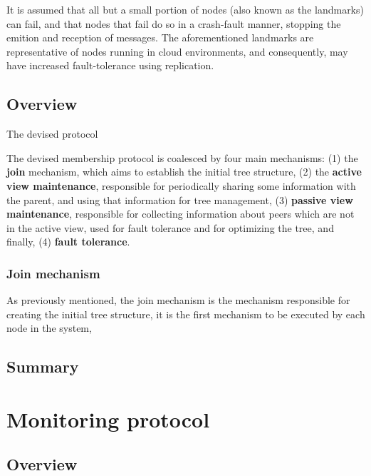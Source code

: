 It is assumed that all but a small portion of nodes (also known as the landmarks) can fail, and that nodes that fail do so in a crash-fault manner, stopping the emition and reception of messages. The aforementioned landmarks are representative of nodes running in cloud environments, and consequently, may have increased fault-tolerance using replication.

\subsection{Overview}

The devised protocol

The devised membership protocol is coalesced by four main mechanisms: (1) the \textbf{join} mechanism, which aims to establish the initial tree structure, (2) the \textbf{active view maintenance}, responsible for periodically sharing some information with the parent, and using that information for tree management, (3) \textbf{passive view maintenance}, responsible for collecting information about peers which are not in the active view, used for fault tolerance and for optimizing the tree, and finally, (4) \textbf{fault tolerance}.

\subsubsection{Join mechanism}

As previously mentioned, the join mechanism is the mechanism responsible for creating the initial tree structure, it is the first mechanism to be executed by each node in the system,











\subsection{Summary}

\section{Monitoring protocol}

\subsection{Overview}

